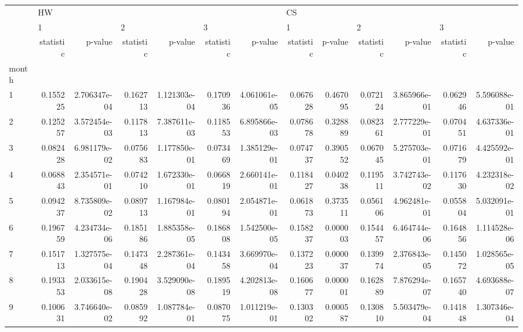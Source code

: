 \begin{tabular}{lrrrrrrrrrrrr}
\toprule
{} & \multicolumn{6}{l}{HW} & \multicolumn{6}{l}{CS} \\
{} & \multicolumn{2}{l}{1} & \multicolumn{2}{l}{2} & \multicolumn{2}{l}{3} & \multicolumn{2}{l}{1} & \multicolumn{2}{l}{2} & \multicolumn{2}{l}{3} \\
{} & statistic &       p-value & statistic &       p-value & statistic &       p-value & statistic &   p-value & statistic &       p-value & statistic &       p-value \\
month &           &               &           &               &           &               &           &           &           &               &           &               \\
\midrule
1     &  0.155225 &  2.706347e-04 &  0.162713 &  1.121303e-04 &  0.170936 &  4.061061e-05 &  0.067628 &  0.467095 &  0.072124 &  3.865966e-01 &  0.062946 &  5.596088e-01 \\
2     &  0.125257 &  3.572454e-03 &  0.117813 &  7.387611e-03 &  0.118553 &  6.895866e-03 &  0.078678 &  0.328889 &  0.082361 &  2.777229e-01 &  0.070451 &  4.637336e-01 \\
3     &  0.082428 &  6.981179e-02 &  0.075683 &  1.177850e-01 &  0.073469 &  1.385129e-01 &  0.074737 &  0.390552 &  0.067045 &  5.275703e-01 &  0.071679 &  4.425592e-01 \\
4     &  0.068843 &  2.354571e-01 &  0.074210 &  1.672330e-01 &  0.066819 &  2.660141e-01 &  0.118427 &  0.040238 &  0.119511 &  3.742743e-02 &  0.117630 &  4.232318e-02 \\
5     &  0.094237 &  8.735809e-02 &  0.089713 &  1.167984e-01 &  0.080194 &  2.054871e-01 &  0.061873 &  0.373511 &  0.056106 &  4.962481e-01 &  0.055804 &  5.032091e-01 \\
6     &  0.196759 &  4.234734e-06 &  0.185186 &  1.885358e-05 &  0.186808 &  1.542500e-05 &  0.158237 &  0.000003 &  0.154457 &  6.464744e-06 &  0.164856 &  1.114528e-06 \\
7     &  0.151713 &  1.327575e-04 &  0.147348 &  2.287361e-04 &  0.143458 &  3.669970e-04 &  0.137223 &  0.000037 &  0.139974 &  2.376843e-05 &  0.145072 &  1.028565e-05 \\
8     &  0.193353 &  2.033615e-08 &  0.190428 &  3.529090e-08 &  0.189519 &  4.202813e-08 &  0.160677 &  0.000001 &  0.162889 &  7.876294e-07 &  0.165740 &  4.693688e-07 \\
9     &  0.100631 &  3.746640e-02 &  0.085992 &  1.087784e-01 &  0.087075 &  1.011219e-01 &  0.130302 &  0.000587 &  0.130810 &  5.503479e-04 &  0.141848 &  1.307346e-04 \\

\end{tabular}
